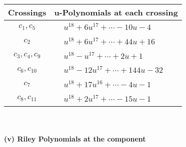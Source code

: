 \documentclass[1p]{elsarticle_modified}
\theoremstyle{definition}
\begin{document}
\begin{tabular}{m{50pt}|m{274pt}}
Crossings & \hspace{64pt}u-Polynomials at each crossing \\
\hline $$\begin{aligned}c_{1},c_{5}\end{aligned}$$&$\begin{aligned}
&u^{18}+6 u^{17}+\cdots-10 u-4
\end{aligned}$\\
\hline $$\begin{aligned}c_{2}\end{aligned}$$&$\begin{aligned}
&u^{18}+6 u^{17}+\cdots+44 u+16
\end{aligned}$\\
\hline $$\begin{aligned}c_{3},c_{4},c_{9}\end{aligned}$$&$\begin{aligned}
&u^{18}- u^{17}+\cdots+2 u+1
\end{aligned}$\\
\hline $$\begin{aligned}c_{6},c_{10}\end{aligned}$$&$\begin{aligned}
&u^{18}-12 u^{17}+\cdots+144 u-32
\end{aligned}$\\
\hline $$\begin{aligned}c_{7}\end{aligned}$$&$\begin{aligned}
&u^{18}+17 u^{16}+\cdots-4 u-1
\end{aligned}$\\
\hline $$\begin{aligned}c_{8},c_{11}\end{aligned}$$&$\begin{aligned}
&u^{18}+2 u^{17}+\cdots-15 u-1
\end{aligned}$\\
\hline
\end{tabular}\\~\\
\newpage\renewcommand{\arraystretch}{1}
\flushleft \textbf{(v) Riley Polynomials at the component}\newline \\
\end{document}
